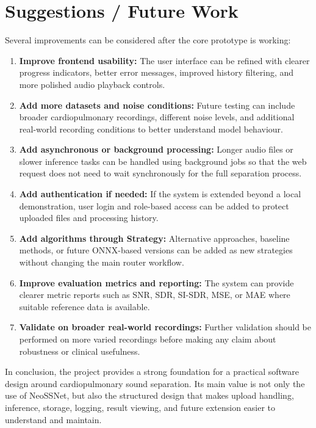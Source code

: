 \section{Suggestions / Future Work}

Several improvements can be considered after the core prototype is working:

\begin{enumerate}
  \item \textbf{Improve frontend usability:} The user interface can be refined with clearer progress indicators, better error messages, improved history filtering, and more polished audio playback controls.
  \item \textbf{Add more datasets and noise conditions:} Future testing can include broader cardiopulmonary recordings, different noise levels, and additional real-world recording conditions to better understand model behaviour.
  \item \textbf{Add asynchronous or background processing:} Longer audio files or slower inference tasks can be handled using background jobs so that the web request does not need to wait synchronously for the full separation process.
  \item \textbf{Add authentication if needed:} If the system is extended beyond a local demonstration, user login and role-based access can be added to protect uploaded files and processing history.
  \item \textbf{Add algorithms through Strategy:} Alternative approaches, baseline methods, or future ONNX-based versions can be added as new strategies without changing the main router workflow.
  \item \textbf{Improve evaluation metrics and reporting:} The system can provide clearer metric reports such as SNR, SDR, SI-SDR, MSE, or MAE where suitable reference data is available.
  \item \textbf{Validate on broader real-world recordings:} Further validation should be performed on more varied recordings before making any claim about robustness or clinical usefulness.
\end{enumerate}

In conclusion, the project provides a strong foundation for a practical software design around cardiopulmonary sound separation. Its main value is not only the use of NeoSSNet, but also the structured design that makes upload handling, inference, storage, logging, result viewing, and future extension easier to understand and maintain.
